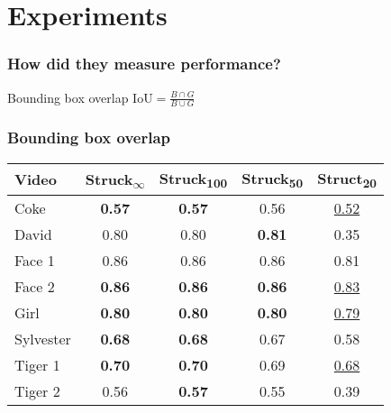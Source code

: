 \documentclass[mathserif,handout]{beamer}
\begin{document}

\section{Experiments}

\begin{frame}
    \frametitle{How did they measure performance?}
    \begin{block}{Bounding box overlap}
        $\text{IoU} = \frac{B \cap G}{B \cup G}$
    \end{block}
\end{frame}

\begin{frame}
    \frametitle{Bounding box overlap}
    \begin{tabular}{l c c c c }
        \toprule
        Video & Struck\textsubscript{$\infty$} & Struck\textsubscript{100} & Struck\textsubscript{50} & Struct\textsubscript{20} \\
        \midrule
        Coke      & \textbf{0.57} & \textbf{0.57} &         0.56  & \underline{0.52} \\
        David     &         0.80  &         0.80  & \textbf{0.81} &            0.35  \\
        Face 1    &         0.86  &         0.86  &         0.86  &            0.81  \\
        Face 2    & \textbf{0.86} & \textbf{0.86} & \textbf{0.86} & \underline{0.83} \\
        Girl      & \textbf{0.80} & \textbf{0.80} & \textbf{0.80} & \underline{0.79} \\
        Sylvester & \textbf{0.68} & \textbf{0.68} &         0.67  &            0.58  \\
        Tiger 1   & \textbf{0.70} & \textbf{0.70} &         0.69  & \underline{0.68} \\
        Tiger 2   &         0.56  & \textbf{0.57} &         0.55  &            0.39  \\
        \bottomrule
    \end{tabular}
\end{frame}
\end{document}
